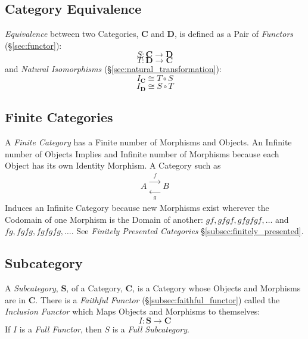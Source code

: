 \subsection{Category Equivalence}\label{subsec:category_equivalence}

\emph{Equivalence} between two Categories, $\mathbf{C}$ and
$\mathbf{D}$, is defined as a Pair of \emph{Functors}
(\S\ref{sec:functor}):
\[
    S : \mathbf{C} \rightarrow \mathbf{D}
\]\[
    T : \mathbf{D} \rightarrow \mathbf{C}
\]
and \emph{Natural Isomorphisms} (\S\ref{sec:natural_transformation}):
\[
    I_\mathbf{C} \cong T \circ S
\]\[
    I_\mathbf{D} \cong S \circ T
\]



\subsection{Finite Categories}\label{subsec:finite_categories}

A \emph{Finite Category} has a Finite number of Morphisms and
Objects. An Infinite number of Objects Implies and Infinite number of
Morphisms because each Object has its own Identity Morphism. A
Category such as
\[
    A
    \begin{matrix}
    \xrightarrow{\;\;f\;\;}\\
    \xleftarrow[\;\;g\;\;]{}
    \end{matrix}
    B
\]
Induces an Infinite Category because new Morphisms exist wherever the
Codomain of one Morphism is the Domain of another: $gf, gfgf, gfgfgf,
\ldots$ and $fg, fgfg, fgfgfg, \ldots$. See \emph{Finitely Presented
  Categories} \S\ref{subsec:finitely_presented}.



\subsection{Subcategory}\label{subsec:subcategory}

A \emph{Subcategory}, $\mathbf{S}$, of a Category, $\mathbf{C}$, is a
Category whose Objects and Morphisms are in $\mathbf{C}$. There is a
\emph{Faithful Functor} (\S\ref{subsec:faithful_functor}) called the
\emph{Inclusion Functor} which Maps Objects and Morphisms to
themselves:
\[
    I : \mathbf{S} \rightarrow \mathbf{C}
\]
If $I$ is a \emph{Full Functor}, then $S$ is a \emph{Full
  Subcategory}.



